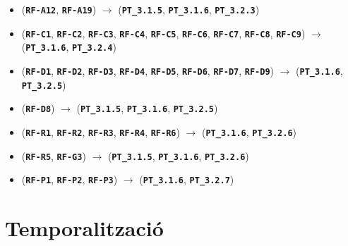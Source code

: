 \documentclass[a4paper,12pt]{ThesisStyle}
\begin{document}
\begin{itemize}
  \item (\texttt{\textbf{RF-A12}}, \texttt{\textbf{RF-A19}}) \hspace{1pt} $\longrightarrow$ \hspace{1pt} (\texttt{\textbf{PT\_3.1.5}}, \texttt{\textbf{PT\_3.1.6}}, \texttt{\textbf{PT\_3.2.3}})
  \item (\texttt{\textbf{RF-C1}}, \texttt{\textbf{RF-C2}}, \texttt{\textbf{RF-C3}}, \texttt{\textbf{RF-C4}}, \texttt{\textbf{RF-C5}}, \texttt{\textbf{RF-C6}}, \texttt{\textbf{RF-C7}}, \texttt{\textbf{RF-C8}}, \texttt{\textbf{RF-C9}}) \hspace{1pt} $\longrightarrow$ \hspace{1pt} (\texttt{\textbf{PT\_3.1.6}}, \texttt{\textbf{PT\_3.2.4}})
  \item (\texttt{\textbf{RF-D1}}, \texttt{\textbf{RF-D2}}, \texttt{\textbf{RF-D3}}, \texttt{\textbf{RF-D4}}, \texttt{\textbf{RF-D5}}, \texttt{\textbf{RF-D6}}, \texttt{\textbf{RF-D7}}, \texttt{\textbf{RF-D9}}) \hspace{1pt} $\longrightarrow$ \hspace{1pt} (\texttt{\textbf{PT\_3.1.6}}, \texttt{\textbf{PT\_3.2.5}})
  \item (\texttt{\textbf{RF-D8}}) \hspace{1pt} $\longrightarrow$ \hspace{1pt} (\texttt{\textbf{PT\_3.1.5}}, \texttt{\textbf{PT\_3.1.6}}, \texttt{\textbf{PT\_3.2.5}})
  \item (\texttt{\textbf{RF-R1}}, \texttt{\textbf{RF-R2}}, \texttt{\textbf{RF-R3}}, \texttt{\textbf{RF-R4}}, \texttt{\textbf{RF-R6}}) \hspace{1pt} $\longrightarrow$ \hspace{1pt} (\texttt{\textbf{PT\_3.1.6}}, \texttt{\textbf{PT\_3.2.6}})
  \item (\texttt{\textbf{RF-R5}}, \texttt{\textbf{RF-G3}}) \hspace{1pt} $\longrightarrow$ \hspace{1pt} (\texttt{\textbf{PT\_3.1.5}}, \texttt{\textbf{PT\_3.1.6}}, \texttt{\textbf{PT\_3.2.6}})
  \item (\texttt{\textbf{RF-P1}}, \texttt{\textbf{RF-P2}}, \texttt{\textbf{RF-P3}}) \hspace{1pt} $\longrightarrow$ \hspace{1pt} (\texttt{\textbf{PT\_3.1.6}}, \texttt{\textbf{PT\_3.2.7}})
\end{itemize}

\section{Temporalització}
\label{sec:temporalitzacio}
\end{document}
